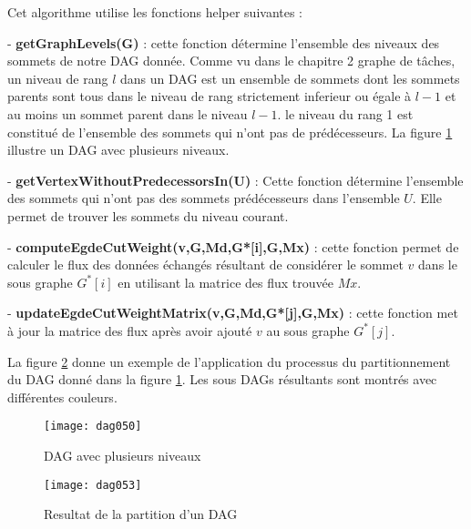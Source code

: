 Cet algorithme utilise les fonctions helper suivantes :

- \textbf{getGraphLevels(G)} : cette fonction détermine l'ensemble des niveaux des sommets de notre DAG donnée. Comme vu dans le chapitre 2 graphe de tâches, un niveau de rang $l$ dans un DAG est un ensemble de sommets dont les sommets parents sont tous dans le niveau de rang strictement inferieur ou égale à $l-1$ et au moins un sommet parent dans le niveau $l-1$.  le niveau du rang 1 est constitué de l'ensemble des sommets qui n'ont pas de prédécesseurs. La figure \ref{fig:FG_4_1} illustre un DAG avec plusieurs niveaux. 

- \textbf{getVertexWithoutPredecessorsIn(U)} : Cette fonction détermine l'ensemble des sommets qui n'ont pas des sommets prédécesseurs dans l'ensemble $U$. Elle permet de trouver les sommets du niveau courant.

- \textbf{computeEgdeCutWeight(v,G,Md,G*[i],G,Mx)} : cette fonction permet de calculer le flux des données échangés résultant de considérer le sommet $v$ dans le sous graphe $G^*[i]$ en utilisant la matrice des flux trouvée $Mx$. 

- \textbf{updateEgdeCutWeightMatrix(v,G,Md,G*[j],G,Mx)} : cette fonction met à jour la matrice des flux après avoir ajouté $v$ au sous graphe $G^*[j]$.

La figure \ref{fig:FG_4_2} donne un exemple de l'application du processus du partitionnement du DAG donné dans la figure \ref{fig:FG_4_1}. Les sous DAGs résultants sont montrés avec différentes couleurs. 
%
\begin{figure}
\texttt{[image: dag050]}
\centering
\caption{DAG avec plusieurs niveaux}
\label{fig:FG_4_1}
\end{figure}
%
\begin{figure}
\texttt{[image: dag053]}
\centering
\caption{Resultat de la partition d'un DAG}
\label{fig:FG_4_2}
\end{figure}
%
